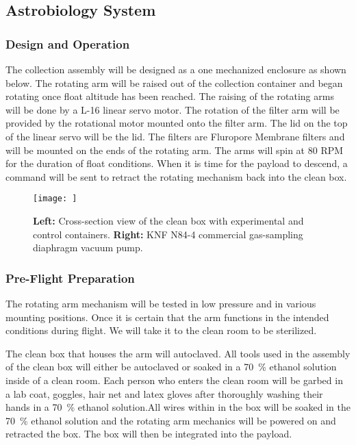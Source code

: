 \subsection{Astrobiology System}
\label{sec:AstrobiologySystem}

\subsubsection{Design and Operation}
The collection assembly will be designed as a one mechanized enclosure as shown below. The rotating arm will be raised out of the collection container and began rotating once float altitude has been reached. The raising of the rotating arms will be done by a L-16 linear servo motor. The rotation of the filter arm will be provided by the rotational motor mounted onto the filter arm. The lid on the top of the linear servo will be the lid. The filters are Fluropore Membrane filters and will be mounted on the ends of the rotating arm. The arms will spin at 80 RPM for the duration of float conditions. When it is time for the payload to descend, a command will be sent to retract the rotating mechanism back into the clean box. 

\begin{figure}[!h] 
	\begin{center}
		\texttt{[image: ]}
		\caption{{\bf Left:} Cross-section view of the clean box with experimental and control containers. {\bf Right:} KNF N84-4 commercial gas-sampling diaphragm vacuum pump. }
		\label{fig:Pump}
	\end{center}
\end{figure} 
\subsubsection{Pre-Flight Preparation}
The rotating arm mechanism will be tested in low pressure and in various mounting positions. Once it is certain that the arm functions in the intended conditions during flight. We will take it to the clean room to be sterilized.  

The clean box that houses the arm  will autoclaved. All tools used in the assembly of the clean box will either be autoclaved or soaked in a \SI{70}{\percent} ethanol solution inside of a clean room. Each person who enters the clean room will be garbed in a lab coat, goggles, hair net and latex gloves after thoroughly washing their hands in a \SI{70}{\percent} ethanol solution.All wires within in the box will be soaked in the \SI{70}{\percent} ethanol solution and the rotating arm mechanics will be powered on and retracted the box. The box will then be integrated into the payload. 
